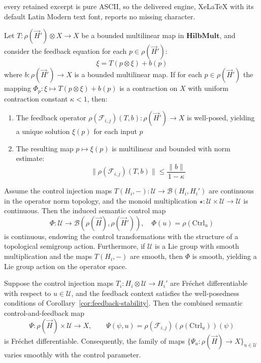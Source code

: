 \documentclass[10pt,a4paper]{amsart}
\begin{document}
every retained excerpt is pure ASCII, so the delivered engine, XeLaTeX with its default Latin Modern text font, reports no missing character.
\begin{corollary}\label{cor:feedback-stability}
Let \( T: \rho(\vec{H}') \otimes X \to X \) be a bounded multilinear map in \(\mathbf{HilbMult}\), and consider the feedback equation for each \( p \in \rho(\vec{H}') \):
\[
\xi = T(p \otimes \xi) + b(p)
\]
where \( b: \rho(\vec{H}') \to X \) is a bounded multilinear map. If for each \( p \in \rho(\vec{H}') \) the mapping \( \Phi_p: \xi \mapsto T(p \otimes \xi) + b(p) \) is a contraction on \( X \) with uniform contraction constant \( \kappa < 1 \), then:

\begin{enumerate}
    \item The feedback operator \( \rho(\mathcal{F}_{i,j})(T,b): \rho(\vec{H}') \to X \) is well-posed, yielding a unique solution \( \xi(p) \) for each input \( p \)
    \item The resulting map \( p \mapsto \xi(p) \) is multilinear and bounded with norm estimate:
    \[
    \|\rho(\mathcal{F}_{i,j})(T,b)\| \le \frac{\|b\|}{1 - \kappa}
    \]
\end{enumerate}
\end{corollary}

\begin{corollary}\label{cor:control-continuity}
Assume the control injection maps \( T(H_i, -): \mathcal{U} \to \mathcal{B}(H_i, H_i') \) are continuous in the operator norm topology, and the monoid multiplication \( \star: \mathcal{U} \times \mathcal{U} \to \mathcal{U} \) is continuous. Then the induced semantic control map
\[
\Phi: \mathcal{U} \to \mathcal{B}(\rho(\vec{H}), \rho(\vec{H}')), \quad \Phi(u) = \rho(\mathrm{Ctrl}_u)
\]
is continuous, endowing the control transformations with the structure of a topological semigroup action. Furthermore, if \( \mathcal{U} \) is a Lie group with smooth multiplication and the maps \( T(H_i, -) \) are smooth, then \( \Phi \) is smooth, yielding a Lie group action on the operator space.
\end{corollary}

\begin{corollary}\label{cor:differentiable-feedback}
Suppose the control injection maps \( T_i: H_i \otimes \mathcal{U} \to H_i' \) are Fr\'echet differentiable with respect to \( u \in \mathcal{U} \), and the feedback context satisfies the well-posedness conditions of Corollary~\ref{cor:feedback-stability}. Then the combined semantic control-and-feedback map
\[
\Psi: \rho(\vec{H}) \times \mathcal{U} \longrightarrow X, 
\qquad 
\Psi(\psi, u) = \rho(\mathcal{F}_{i,j})(\rho(\mathrm{Ctrl}_u))(\psi)
\]
is Fr\'echet differentiable. Consequently, the family of maps \( \{\Psi_u: \rho(\vec{H}) \to X\}_{u \in \mathcal{U}} \) varies smoothly with the control parameter.
\end{corollary}
\end{document}
